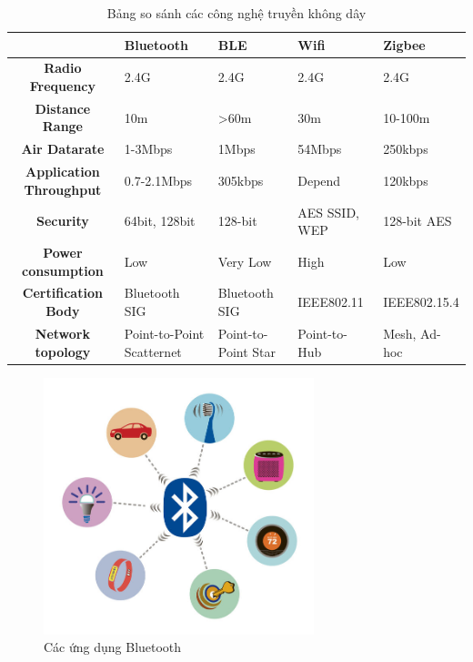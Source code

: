 	\begin{table}[ht]
		\begin{tabular}{ |c|m{2cm}|m{2cm}|m{2cm}|m{2cm}| } 
			\hline
			& \textbf{Bluetooth} & \textbf{BLE} & \textbf{Wifi} & \textbf{Zigbee} \\ 
			\hline
			\textbf{Radio Frequency} &	2.4G &	2.4G &	2.4G &	2.4G \\ 
			\hline
			\textbf{Distance Range} &	10m	&>60m &	30m	& 10-100m \\ 
			\hline
			\textbf{Air Datarate} &	1-3Mbps &	1Mbps &	54Mbps &	250kbps \\
			\hline
			\textbf{Application Throughput} &	0.7-2.1Mbps &	305kbps &Depend &120kbps\\
			\hline
			\textbf{Security} &	64bit, 128bit &	128-bit & AES	SSID, WEP&	128-bit AES \\
			\hline
			\textbf{Power consumption}&	Low	&Very Low&	High&	Low \\
			\hline
			\textbf{Certification Body}&	Bluetooth SIG&	Bluetooth SIG&	IEEE802.11&	IEEE802.15.4 \\
			\hline
			\textbf{Network topology} &	Point-to-Point Scatternet&	Point-to-Point Star&	Point-to-Hub& 		Mesh, Ad-hoc\\
			\hline
		\end{tabular}
		\caption {Bảng so sánh các công nghệ truyền không dây}
		\label{table:1.1}
	\end{table}

\begin{figure}[ht]
	\centering    
	\includegraphics[width=0.7\textwidth]{btuse}
	\caption[Các ứng dụng Bluetooth]{Các ứng dụng Bluetooth}
	\label{fig:btuse}
\end{figure}

